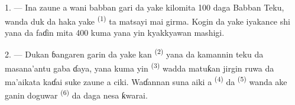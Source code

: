 %
%
%
%

\VUsaut{2.0mm}
\VUsaut{3.0mm}
\VUfilet{16mm}
\VUsaut{5.6mm}
\VUsaut{1.4mm}
\VUsaut{2.2mm}

\VUsaut{3.0mm}

1. --- Ina zaune a wani babban gari da yake kilomita 100 daga Babban
Teku, wanda duk da haka yake 
\textsuperscript{(1)} ta matsayi mai girma. Kogin da yake iyakance shi
yana da faɗin mita 400 kuma yana yin kyakkyawan mashigi.

2. --- Dukan ɓangaren garin da yake kan 
\textsuperscript{(2)} yana da kamannin teku da masana’antu gaba ɗaya, yana
kuma yin  \textsuperscript{(3)} wadda matuƙan
jirgin ruwa da ma’aikata kaɗai suke zaune a ciki. Waɗannan suna aiki a
 \textsuperscript{(4)} da 
\textsuperscript{(5)} wanda ake ganin doguwar 
\textsuperscript{(6)} da  daga nesa ƙwarai.

